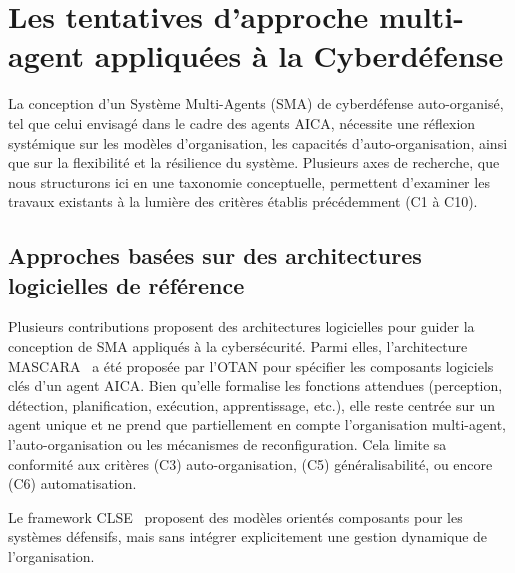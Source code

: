 \documentclass[ twoside,openright,titlepage,numbers=noenddot,headinclude,%
                footinclude=true,cleardoublepage=empty,abstractoff, %
                BCOR=5mm,paper=a4,fontsize=11pt,%
                french,american,%
                ]{scrreprt}
\begin{document}
\section{Les tentatives d'approche multi-agent appliquées à la Cyberdéfense}\label{sec:sma-conception-aica}

La conception d'un Système Multi-Agents (SMA) de cyberdéfense auto-organisé, tel que celui envisagé dans le cadre des agents AICA, nécessite une réflexion systémique sur les modèles d'organisation, les capacités d'auto-organisation, ainsi que sur la flexibilité et la résilience du système. Plusieurs axes de recherche, que nous structurons ici en une taxonomie conceptuelle, permettent d'examiner les travaux existants à la lumière des critères établis précédemment (C1 à C10).

\subsection*{Approches basées sur des architectures logicielles de référence}

Plusieurs contributions proposent des architectures logicielles pour guider la conception de SMA appliqués à la cybersécurité. Parmi elles, l'architecture MASCARA~\cite{Kott2023} a été proposée par l'OTAN pour spécifier les composants logiciels clés d'un agent AICA. Bien qu'elle formalise les fonctions attendues (perception, détection, planification, exécution, apprentissage, etc.), elle reste centrée sur un agent unique et ne prend que partiellement en compte l'organisation multi-agent, l'auto-organisation ou les mécanismes de reconfiguration. Cela limite sa conformité aux critères (C3) auto-organisation, (C5) généralisabilité, ou encore (C6) automatisation.

Le framework CLSE~\cite{Hammar2023} proposent des modèles orientés composants pour les systèmes défensifs, mais sans intégrer explicitement une gestion dynamique de l'organisation.
\end{document}
